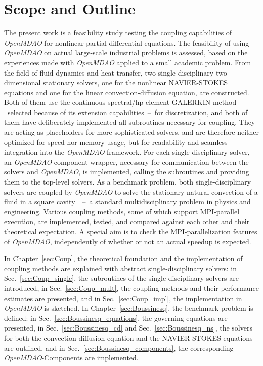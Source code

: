 \documentclass[10pt, ngerman, english,
twoside, open=right,
numbers=noenddot,
declaration=section,
abstract=section,
abstract=multiple,
abstract=notoc,
declaration=notoc,
cd=pale, 
chapterprefix=off, 
chapterpage=false, 
headingsvskip=-10em,
cdgeometry=custom, 
slantedgreek=on,
cdmath=on, 
cdfont=on,
ttfont=false,
mathswap=off,
]{tudscrreprt}
\numberwithin{equation}{chapter}
\renewcommand{\textsc}[1]{\uppercase{\mbox{#1}}}
\newcommand{\sidenote}[1]{
  \leavevmode %
  \marginpar{\hyphenpenalty=1000 \flushleft{\textcolor{HKS41}{#1}}}}
\begin{document}
\section{Scope and Outline}
\sidenote{Scope}The present work is a feasibility study testing the coupling capabilities of \textit{OpenMDAO} for nonlinear partial differential equations. The feasibility of using \textit{OpenMDAO} on actual large-scale industrial problems is assessed, based on the experiences made with \textit{OpenMDAO} applied to a small academic problem.
From the field of fluid dynamics and heat transfer, two single-disciplinary two-dimensional stationary solvers, one for the nonlinear \textsc{Navier}-\textsc{Stokes} equations and one for the linear convection-diffusion equation, are constructed. 
Both of them use the continuous spectral/hp element \textsc{Galerkin} method~\cite{KarniadakisSpencer, Giraldo, DevilleFischer}~--~selected because of its extension capabilities~--~for discretization, and both of them have deliberately implemented all subroutines necessary for coupling. They are acting as placeholders for more sophisticated solvers, and are therefore neither optimized for speed nor memory usage, but for readability and seamless integration into the \textit{OpenMDAO} framework.
For each single-disciplinary solver, an \textit{OpenMDAO}-component wrapper, necessary for communication between the solvers and \textit{OpenMDAO}, is implemented, calling the subroutines and providing them to the top-level solvers.
As a benchmark problem, both single-disciplinary solvers are coupled by \textit{OpenMDAO} to solve the stationary natural convection of a fluid in a square cavity~\cite{DeVahl}~--~a standard multidisciplinary problem in physics and engineering. 
Various coupling methods, some of which support MPI-parallel execution, are implemented, tested, and compared against each other and their theoretical expectation.
A special aim is to check the MPI-parallelization features of \textit{OpenMDAO}, independently of whether or not an actual speedup is expected.
\par
\sidenote{Outline}In Chapter~\ref{sec:Coup}, the theoretical foundation and the implementation of coupling methods are explained with abstract single-disciplinary solvers: in Sec.~\ref{sec:Coup_single}, the subroutines of the single-disciplinary solvers are introduced, in Sec.~\ref{sec:Coup_mult}, the coupling methods and their performance estimates are presented, and in Sec.~\ref{sec:Coup_impl}, the implementation in \textit{OpenMDAO} is sketched.
In Chapter~\ref{sec:Boussinesq}, the benchmark problem is defined: in Sec.~\ref{sec:Boussinesq_equations}, the governing equations are presented, in Sec.~\ref{sec:Boussinesq_cd} and Sec.~\ref{sec:Boussinesq_ns}, the solvers for both the convection-diffusion equation and the \textsc{Navier}-\textsc{Stokes} equations are outlined, and in Sec.~\ref{sec:Boussinesq_components}, the corresponding \textit{OpenMDAO}-Components are implemented.
\end{document}
